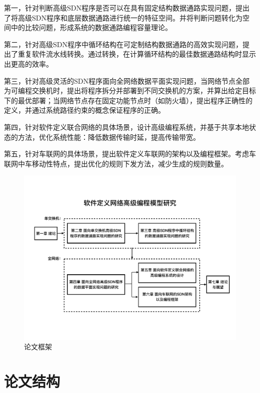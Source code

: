 第一，针对判断高级SDN程序是否可以在具有固定结构数据通路实现问题，提出了将高级SDN程序和底层数据通路进行统一的特征空间。并将判断问题转化为空间中的比较问题，形成系统的数据通路编程容量理论。

第二，针对高级SDN程序中循环结构在可定制结构数据通路的高效实现问题，提出了重复软件流水线转换。通过转换，在计算循环结构的最佳数据通路结构时显示出更高的效率。

第三，针对高级灵活的SDN程序面向全网络数据平面实现问题，当网络节点全部为可编程交换机时，提出将程序拆分并部署到不同交换机的方案，并算出给定目标下的最优部署；当网络节点存在固定功能节点时（如防火墙），提出程序正确性的定义，并通过系统路径约束的概念保证程序的正确。

第四，针对软件定义联合网络的具体场景，设计高级编程系统，并基于共享本地状态的方法，优化系统性能：降低数据传输时延，提高传输带宽。

第五，针对车联网的具体场景，提出软件定义车联网的架构以及编程框架。考虑车联网中车移动性特点，提出优化的规则下发方法，减少生成的规则数量。

\begin{figure}[h!]
    \centering
    \includegraphics[width=0.9\linewidth]{figures/intro-fig1.pdf}
    \caption{论文框架}
    \label{intro:fig1}
\end{figure}


\section{论文结构}

